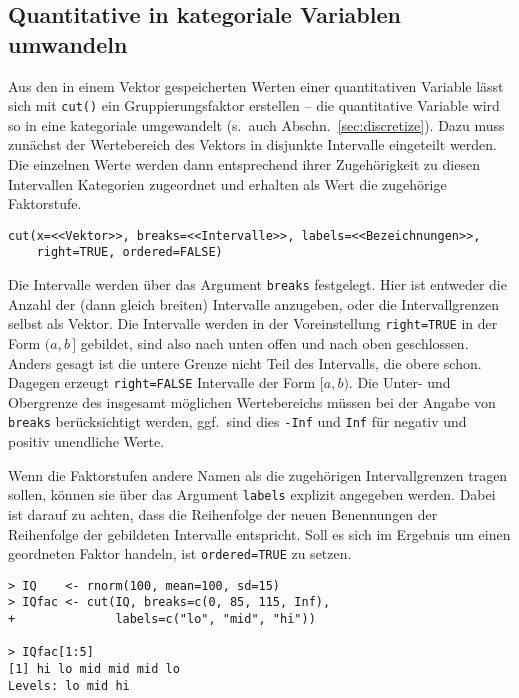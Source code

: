 \subsection{Quantitative in kategoriale Variablen umwandeln}
\label{sec:cut}

Aus den in einem Vektor gespeicherten Werten einer quantitativen Variable lässt sich mit \lstinline!cut()! ein Gruppierungsfaktor erstellen -- die quantitative Variable wird so in eine kategoriale umgewandelt (s.\ auch Abschn.\ \ref{sec:discretize}). Dazu muss zunächst der Wertebereich des Vektors in disjunkte Intervalle eingeteilt werden. Die einzelnen Werte werden dann entsprechend ihrer Zugehörigkeit zu diesen Intervallen Kategorien zugeordnet und erhalten als Wert die zugehörige Faktorstufe.
\begin{lstlisting}
cut(x=<<Vektor>>, breaks=<<Intervalle>>, labels=<<Bezeichnungen>>,
    right=TRUE, ordered=FALSE)
\end{lstlisting}

Die Intervalle werden über das Argument \lstinline!breaks! festgelegt. Hier ist entweder die Anzahl der (dann gleich breiten) Intervalle anzugeben, oder die Intervallgrenzen selbst als Vektor. Die Intervalle werden in der Voreinstellung \lstinline!right=TRUE! in der Form $(a, b\,]$ gebildet, sind also nach unten offen und nach oben geschlossen. Anders gesagt ist die untere Grenze nicht Teil des Intervalls, die obere schon. Dagegen erzeugt \lstinline!right=FALSE! Intervalle der Form $[a, b)$. Die Unter- und Obergrenze des insgesamt möglichen Wertebereichs müssen bei der Angabe von \lstinline!breaks! berücksichtigt werden, ggf.\ sind dies \lstinline!-Inf! und \lstinline!Inf! für negativ und positiv unendliche Werte.

Wenn die Faktorstufen andere Namen als die zugehörigen Intervallgrenzen tragen sollen, können sie über das Argument \lstinline!labels! explizit angegeben werden. Dabei ist darauf zu achten, dass die Reihenfolge der neuen Benennungen der Reihenfolge der gebildeten Intervalle entspricht. Soll es sich im Ergebnis um einen geordneten Faktor handeln, ist \lstinline!ordered=TRUE! zu setzen.
\begin{lstlisting}
> IQ    <- rnorm(100, mean=100, sd=15)
> IQfac <- cut(IQ, breaks=c(0, 85, 115, Inf),
+              labels=c("lo", "mid", "hi"))

> IQfac[1:5]
[1] hi lo mid mid mid lo
Levels: lo mid hi
\end{lstlisting}

